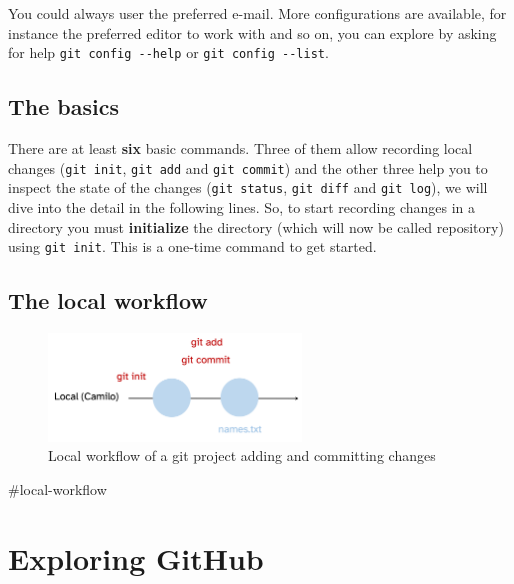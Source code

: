 \documentclass[
  letterpaper,
  DIV=11,
  numbers=noendperiod,
  oneside]{scrreprt}
\begin{document}
You could always user the preferred e-mail. More configurations are
available, for instance the preferred editor to work with and so on, you
can explore by asking for help \texttt{git\ config\ -\/-help} or
\texttt{git\ config\ -\/-list}.

\hypertarget{the-basics}{%
\subsection{The basics}\label{the-basics}}

There are at least \textbf{six} basic commands. Three of them allow
recording local changes (\texttt{git\ init}, \texttt{git\ add} and
\texttt{git\ commit}) and the other three help you to inspect the state
of the changes (\texttt{git\ status}, \texttt{git\ diff} and
\texttt{git\ log}), we will dive into the detail in the following lines.
So, to start recording changes in a directory you must
\textbf{initialize} the directory (which will now be called repository)
using \texttt{git\ init}. This is a one-time command to get started.

\hypertarget{the-local-workflow}{%
\subsection{The local workflow}\label{the-local-workflow}}

\begin{figure}

{\centering \includegraphics[width=0.6\textwidth,height=\textheight]{chs-command-line/imgs-cli/gitlocal.png}

}

\caption{Local workflow of a git project adding and committing changes}

\end{figure}

\#local-workflow

\hypertarget{exploring-github}{%
\section{Exploring GitHub}\label{exploring-github}}
\end{document}
